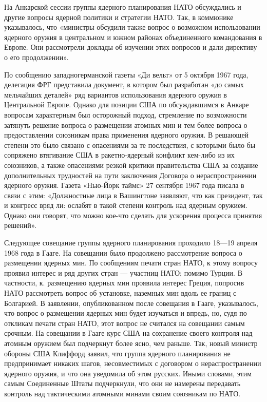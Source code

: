 \documentclass[12pt, a4paper, openany]{book}
\begin{document}
	На Анкарской сессии группы ядерного планирования НАТО обсуждались и другие вопросы ядерной политики и стратегии НАТО. Так, в коммюнике указывалось, что «министры обсудили также вопрос о возможном использовании ядерного оружия в центральном и южном районах объединенного командования в Европе. Они рассмотрели доклады об изучении этих вопросов и дали директиву о его продолжении».
	
	По сообщению западногерманской газеты «Ди вельт» от 5 октября 1967 года, делегация ФРГ представила документ, в котором был разработан «до самых мельчайших деталей» ряд вариантов использования ядерного оружия в Центральной Европе. Однако для позиции США по обсуждавшимся в Анкаре вопросам характерным был осторожный подход, стремление по возможности затянуть решение вопроса о размещении атомных мин и тем более вопроса о предоставлении союзникам права применения ядерного оружия. В решающей степени это было связано с опасениями за те последствия, с которыми было бы сопряжено втягивание США в ракетно-ядерный конфликт кем-либо из их союзников, а также опасениями резкой критики правительства США за создание дополнительных трудностей на пути заключения Договора о нераспространении ядерного оружия. Газета «Нью-Йорк таймс» 27 сентября 1967 года писала в связи с этим: «Должностные лица в Вашингтоне заявляют, что как президент, так и конгресс вряд ли: ослабят в такой степени контроль над ядерным оружием. Однако они говорят, что можно кое-что сделать для ускорения процесса принятия решений».
	
	Следующее совещание группы ядерного планирования проходило 18—19 апреля 1968 года в Гааге. На совещании было продолжено рассмотрение вопроса о размещении ядерных мин. По сообщениям печати стран НАТО, к этому вопросу проявил интерес и ряд других стран — участниц НАТО; помимо Турции. В частности, к. размещению ядерных мин проявила интерес Греция, попросив НАТО рассмотреть вопрос об установке, наземных мин вдоль ее границ с Болгарией. В заявлении, опубликованном после совещания в Гааге, указывалось, что вопрос о размещении ядерных мин будет изучаться и впредь, но, судя по откликам печати стран НАТО, этот вопрос не считался на совещании самым срочным. На совещании в Гааге курс США на сохранение своего контроля над атомным оружием был подчеркнут более ясно, чем раньше. Так, новый министр обороны США Клиффорд заявил, что группа ядерного планирования не предпринимает никаких шагов, несовместимых с договором о нераспространении ядерного оружия, и что она уведомила об этом русских. Иными словами, этим самым Соединенные Штаты подчеркнули, что они не намерены передавать контроль над тактическими атомными минами своим союзникам по НАТО.
	
\end{document}
